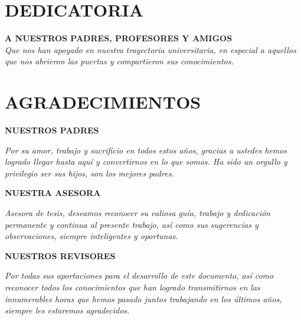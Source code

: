 
\chapter*{DEDICATORIA}
\thispagestyle{empty}

	\begin{flushright}
	\vfill
	\textbf{A NUESTROS PADRES, PROFESORES Y AMIGOS}\\
	\textit{Que nos han apoyado en nuestra trayectoria universitaria, en especial a aquellos\\ que nos abrieron las puertas y compartieron sus conocimientos.}
	\vfill
\end{flushright}

\chapter*{AGRADECIMIENTOS}
\thispagestyle{empty}
\vfill
{\flushright \textbf{NUESTROS PADRES}\\}

\textit{Por su amor, trabajo y sacrificio en todos estos años, gracias a ustedes hemos logrado llegar hasta aquí y convertirnos en lo que somos. Ha sido un orgullo y privilegio ser sus hijos, son los mejores padres.}
\newline

{\flushright \textbf{NUESTRA ASESORA\\}}

\textit{Asesora de tesis, deseamos reconocer su valiosa guía, trabajo y dedicación permanente y continua al presente trabajo, así como sus sugerencias y observaciones, siempre inteligentes y oportunas.}
\newline

{\flushright \textbf{NUESTROS REVISORES}\\}

\textit{Por todas sus aportaciones para el desarrollo de este documento, así como reconocer todos los conocimientos que han logrado transmitirnos en las innumerables horas que hemos pasado juntos trabajando en los últimos años, siempre les estaremos agradecidos.}
\newline
\vfill






